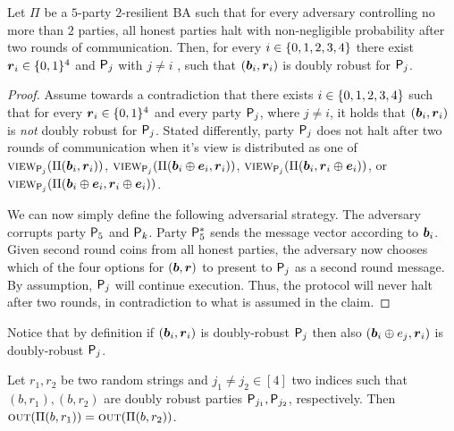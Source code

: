 \begin{claim}\label{clm:exists_double_robust_string}
Let $\Pi$ be a $5$-party $2$-resilient BA such that for every adversary controlling no more than $2$ parties, all honest parties halt with non-negligible probability after two rounds of communication.
Then, for every $i \in \{0,1,2,3,4\}$ there exist ${ \boldsymbol{r}}_i \in \{0,1\}^4$ and $\mathsf{P}_j$ with $j \neq i$ , such that $({ \boldsymbol{b}}_i,{ \boldsymbol{r}}_i)$ is doubly robust for $\mathsf{P}_j$.
\end{claim}

\begin{proof}
Assume towards a contradiction that there exists $i \in \{0,1,2,3,4\}$ such that for every ${{ \boldsymbol{r}}_i \in \{0,1\}^4}$ and every party $\mathsf{P}_j$, where $j \neq i$, it holds that $({ \boldsymbol{b}}_i,{ \boldsymbol{r}}_i)$ is \emph{not} doubly robust for $\mathsf{P}_j$. Stated differently, party $\mathsf{P}_j$  does not halt after two rounds of communication when it's view is distributed as one of $\textsc{view}_{\mathsf{P}_j}(\Pi({ \boldsymbol{b}}_i,{ \boldsymbol{r}}_i))$, $\textsc{view}_{\mathsf{P}_j}(\Pi({ \boldsymbol{b}}_i \oplus { \boldsymbol{e}}_i,{ \boldsymbol{r}}_i))$, $\textsc{view}_{\mathsf{P}_j}(\Pi({ \boldsymbol{b}}_i,{ \boldsymbol{r}}_i \oplus { \boldsymbol{e}}_i))$, or $\textsc{view}_{\mathsf{P}_j}(\Pi({ \boldsymbol{b}}_i \oplus { \boldsymbol{e}}_i,{ \boldsymbol{r}}_i \oplus { \boldsymbol{e}}_i))$.

We can now simply define the following adversarial strategy. The adversary corrupts party $\mathsf{P}_5$ and $\mathsf{P}_k$.  Party $\mathsf{P}_5^\ast$ sends the message vector according to ${ \boldsymbol{b}}_i$. Given second round coins from all honest parties, the adversary now chooses which of the four options for $({ \boldsymbol{b}},{ \boldsymbol{r}})$ to present to $\mathsf{P}_j$  as a second round message. By assumption, $\mathsf{P}_j$ will continue execution. Thus, the protocol will never halt after two rounds, in contradiction to what is assumed in the claim.
\end{proof}

Notice that by definition if $({ \boldsymbol{b}}_i,{ \boldsymbol{r}}_i)$ is doubly-robust  \wrt $\mathsf{P}_j$ then also $({ \boldsymbol{b}}_i \oplus e_j, { \boldsymbol{r}}_i)$ is doubly-robust \wrt $\mathsf{P}_j$.
\begin{claim}\label{clm:doubly_robust_strings_output_the_same}
	Let $r_1,r_2$ be two random strings and $j_1 \neq j_2 \in [4]$ two indices such that $(b,r_1),(b,r_2)$ are doubly robust \wrt parties $\mathsf{P}_{j_1},\mathsf{P}_{j_2}$, respectively. Then $\textsc{out}(\Pi(b,r_1)) = \textsc{out}(\Pi(b,r_2))$.
\end{claim}

